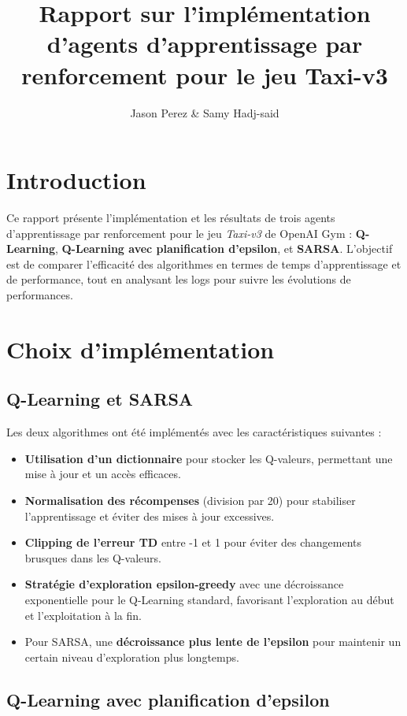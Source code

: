 \documentclass{article}
\title{Rapport sur l'implémentation d'agents d'apprentissage par renforcement pour le jeu Taxi-v3}
\author{Jason Perez & Samy Hadj-said}
\begin{document}
\maketitle

\section{Introduction}

Ce rapport présente l'implémentation et les résultats de trois agents d'apprentissage par renforcement pour le jeu \textit{Taxi-v3} de OpenAI Gym : \textbf{Q-Learning}, \textbf{Q-Learning avec planification d'epsilon}, et \textbf{SARSA}. L'objectif est de comparer l'efficacité des algorithmes en termes de temps d'apprentissage et de performance, tout en analysant les logs pour suivre les évolutions de performances.

\section{Choix d'implémentation}

\subsection{Q-Learning et SARSA}

Les deux algorithmes ont été implémentés avec les caractéristiques suivantes :
\begin{itemize}
    \item \textbf{Utilisation d'un dictionnaire} pour stocker les Q-valeurs, permettant une mise à jour et un accès efficaces.
    \item \textbf{Normalisation des récompenses} (division par 20) pour stabiliser l'apprentissage et éviter des mises à jour excessives.
    \item \textbf{Clipping de l'erreur TD} entre -1 et 1 pour éviter des changements brusques dans les Q-valeurs.
    \item \textbf{Stratégie d'exploration epsilon-greedy} avec une décroissance exponentielle pour le Q-Learning standard, favorisant l'exploration au début et l'exploitation à la fin.
    \item Pour SARSA, une \textbf{décroissance plus lente de l'epsilon} pour maintenir un certain niveau d'exploration plus longtemps.
\end{itemize}

\subsection{Q-Learning avec planification d'epsilon}
\end{document}
